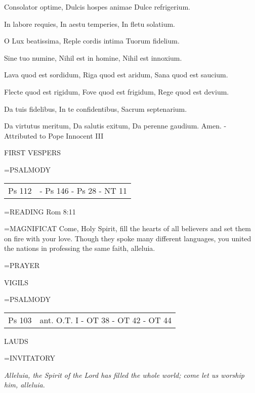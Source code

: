 Consolator optime,
Dulcis hospes animae
Dulce refrigerium.

In labore requies,
In aestu temperies,
In fletu solatium.

O Lux beatissima,
Reple cordis intima
Tuorum fidelium.

Sine tuo numine,
Nihil est in homine,
Nihil est innoxium.

Lava quod est sordidum,
Riga quod est aridum,
Sana quod est saucium.

Flecte quod est rigidum,
Fove quod est frigidum,
Rege quod est devium.

Da tuis fidelibus,
In te confidentibus,
Sacrum septenarium.

Da virtutus meritum,
Da salutis exitum,
Da perenne gaudium. Amen.
- Attributed to Pope Innocent III

\begin{flushleft}\normalsize FIRST VESPERS\\\end{flushleft}
\hangindent=\parindent \small{PSALMODY}
\begin{center}
\begin{tabular}{ l l }
Ps 112 &  - Ps 146 - Ps 28 - NT 11\\
\end{tabular}
\end{center}		

\hangindent=\parindent \small{\uppercase{READING}}	Rom 8:11 \textbf{\\}

\hangindent=\parindent \small{MAGNIFICAT 	Come, Holy Spirit, fill the hearts of all believers and set them on fire with your love. Though they spoke many different languages, you united the nations in professing the same faith, alleluia.\\}

\hangindent=\parindent \small{PRAYER 	}

\begin{flushleft}\normalsize VIGILS\\\end{flushleft}
\hangindent=\parindent \small{PSALMODY}
\begin{center}
\begin{tabular}{ l l }
Ps 103 &  ant. O.T. I - OT 38 - OT 42 - OT 44\\
\end{tabular}
\end{center}		

\begin{flushleft}\normalsize LAUDS\\\end{flushleft}
\hangindent=\parindent \small{INVITATORY}
\begin{center}
\textit{Alleluia, the Spirit of the Lord has filled the whole world; come let us worship him, alleluia.\\}
\end{center}


